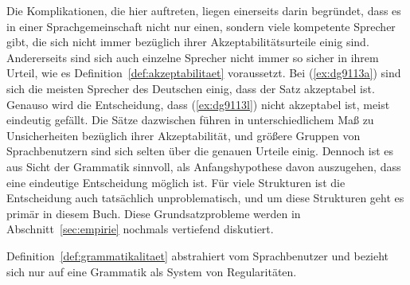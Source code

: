 \begin{exe}
  \ex\label{ex:dg9113}
  \begin{xlist}
  \end{xlist}
\end{exe}

Die Komplikationen, die hier auftreten, liegen einerseits darin begründet, dass es in einer Sprachgemeinschaft nicht nur einen, sondern viele kompetente Sprecher gibt, die sich nicht immer bezüglich ihrer Akzeptabilitätsurteile einig sind.  
Andererseits sind sich auch einzelne Sprecher nicht immer so sicher in ihrem Urteil, wie es Definition~\ref{def:akzeptabilitaet} voraussetzt.
Bei (\ref{ex:dg9113a}) sind sich die meisten Sprecher des Deutschen einig, dass der Satz akzeptabel ist.
Genauso wird die Entscheidung, dass (\ref{ex:dg9113l}) nicht akzeptabel ist, meist eindeutig gefällt.
Die Sätze dazwischen führen in unterschiedlichem Maß zu Unsicherheiten bezüglich ihrer Akzeptabilität, und größere Gruppen von Sprachbenutzern sind sich selten über die genauen Urteile einig.
Dennoch ist es aus Sicht der Grammatik sinnvoll, als Anfangshypothese davon auszugehen, dass eine eindeutige Entscheidung möglich ist.
Für viele Strukturen ist die Entscheidung auch tatsächlich unproblematisch, und um diese Strukturen geht es primär in diesem Buch.
Diese Grundsatzprobleme werden in Abschnitt~\ref{sec:empirie} nochmals vertiefend diskutiert.

Definition~\ref{def:grammatikalitaet} abstrahiert vom Sprachbenutzer und bezieht sich nur auf eine Grammatik als System von Regularitäten.

